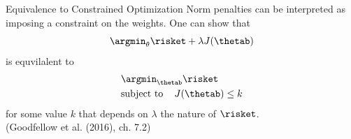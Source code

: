 
\begin{frame}{Equivalence to Constrained Optimization}
Norm penalties can be interpreted as imposing a constraint on the weights. One can show that 
 $$\argmin_{\theta} \risket + \lambda \text{\(J(\thetab)\)}$$
 is equvilalent to
 \begin{align*}
 & \argmin_{\thetab}  \risket \\
  &\text{subject to \;\;\;}  J(\thetab) \leq k
 \end{align*}
 for some value $k$ that depends on $\lambda$ the nature of 
 $\risket$.\\[0.3cm]
 \scriptsize{(Goodfellow et al. (2016), ch. 7.2)}
\end{frame}

